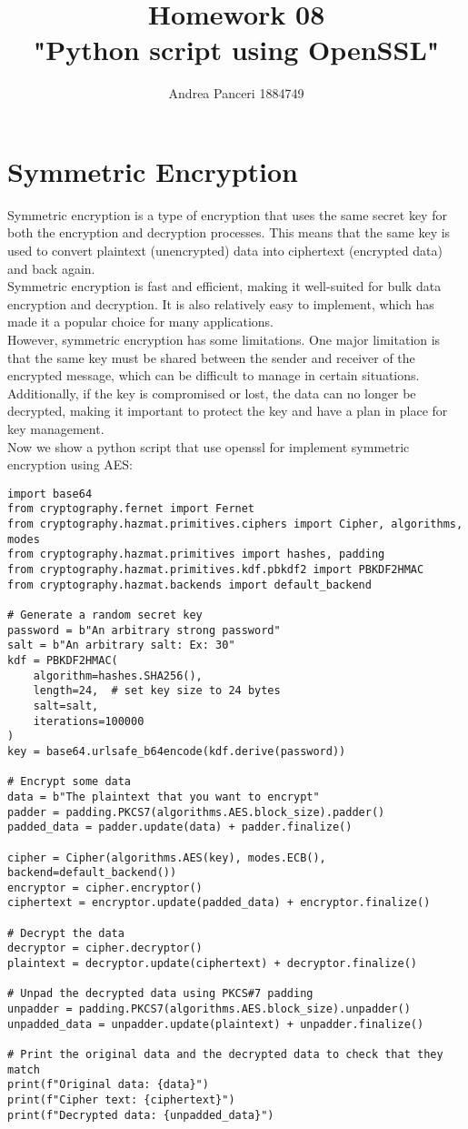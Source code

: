 \documentclass{article}
\title{Homework 08\\"Python script using OpenSSL"}
\author{Andrea Panceri 1884749}
\begin{document}
\maketitle

\section{Symmetric Encryption}
Symmetric encryption is a type of encryption that uses the same secret key for both the encryption and decryption processes. This means that the same key is used to convert plaintext (unencrypted) data into ciphertext (encrypted data) and back again.\\
Symmetric encryption is fast and efficient, making it well-suited for bulk data encryption and decryption. It is also relatively easy to implement, which has made it a popular choice for many applications.\\
However, symmetric encryption has some limitations. One major limitation is that the same key must be shared between the sender and receiver of the encrypted message, which can be difficult to manage in certain situations. Additionally, if the key is compromised or lost, the data can no longer be decrypted, making it important to protect the key and have a plan in place for key management.\\
Now we show a python script that use openssl for implement symmetric encryption using AES:
\begin{lstlisting}
import base64
from cryptography.fernet import Fernet
from cryptography.hazmat.primitives.ciphers import Cipher, algorithms, modes
from cryptography.hazmat.primitives import hashes, padding
from cryptography.hazmat.primitives.kdf.pbkdf2 import PBKDF2HMAC
from cryptography.hazmat.backends import default_backend

# Generate a random secret key
password = b"An arbitrary strong password"
salt = b"An arbitrary salt: Ex: 30"
kdf = PBKDF2HMAC(
    algorithm=hashes.SHA256(),
    length=24,  # set key size to 24 bytes
    salt=salt,
    iterations=100000
)
key = base64.urlsafe_b64encode(kdf.derive(password))

# Encrypt some data
data = b"The plaintext that you want to encrypt"
padder = padding.PKCS7(algorithms.AES.block_size).padder()
padded_data = padder.update(data) + padder.finalize()

cipher = Cipher(algorithms.AES(key), modes.ECB(), backend=default_backend())
encryptor = cipher.encryptor()
ciphertext = encryptor.update(padded_data) + encryptor.finalize()

# Decrypt the data
decryptor = cipher.decryptor()
plaintext = decryptor.update(ciphertext) + decryptor.finalize()

# Unpad the decrypted data using PKCS#7 padding
unpadder = padding.PKCS7(algorithms.AES.block_size).unpadder()
unpadded_data = unpadder.update(plaintext) + unpadder.finalize()

# Print the original data and the decrypted data to check that they match
print(f"Original data: {data}")
print(f"Cipher text: {ciphertext}")
print(f"Decrypted data: {unpadded_data}")
\end{lstlisting}
\end{document}
